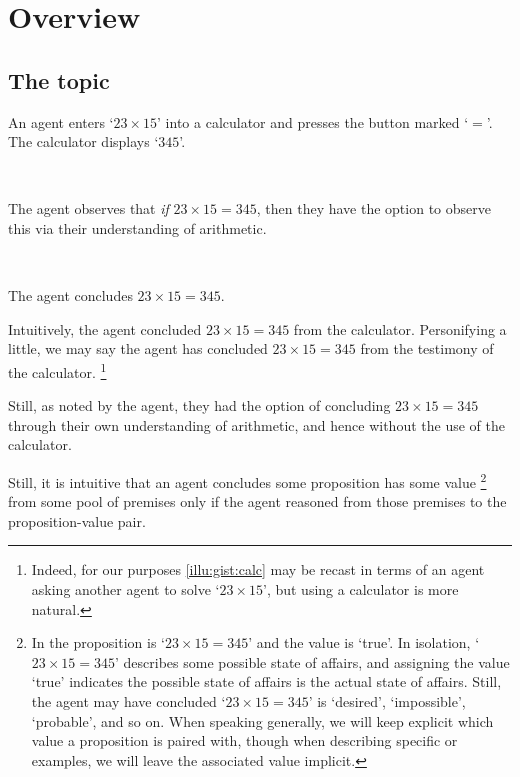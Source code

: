 \chapter{Overview}
\label{cha:overview}

\section{The topic}
\label{sec:issue}

\begin{note}
  \begin{scenario}[Multiplication]
    \label{illu:gist:calc}
    An agent enters `\(23 \times 15\)' into a calculator and presses the button marked `\(=\)'.
    The calculator displays `\(345\)'.

    \mbox{ }

    The agent observes that \emph{if} \(23 \times 15 = 345\), then they have the option to observe this via their understanding of arithmetic.

    \mbox{ }

    The agent concludes \(23 \times 15 = 345\).
  \end{scenario}

  Intuitively, the agent concluded \(23 \times 15 = 345\) from the calculator.
  Personifying a little, we may say the agent has concluded \(23 \times 15 = 345\) from the testimony of the calculator.%
  \footnote{
    Indeed, for our purposes \autoref{illu:gist:calc} may be recast in terms of an agent asking another agent to solve `\(23 \times 15\)', but using a calculator is more natural.
  }

  Still, as noted by the agent, they had the option of concluding \(23 \times 15 = 345\) through their own understanding of arithmetic, and hence without the use of the calculator.

  Still, it is intuitive that an agent concludes some proposition has some value%
  \footnote{In  the proposition is `\(23 \times 15 = 345\)' and the value is `true'.
    In isolation, `\(23 \times 15 = 345\)' describes some possible state of affairs, and assigning the value `true' indicates the possible state of affairs is the actual state of affairs.
    Still, the agent may have concluded `\(23 \times 15 = 345\)' is `desired', `impossible', `probable', and so on.
    When speaking generally, we will keep explicit which value a proposition is paired with, though when describing specific  or examples, we will leave the associated value implicit.
  }
  from some pool of premises only if the agent reasoned from those premises to the proposition-value pair.


\end{note}
